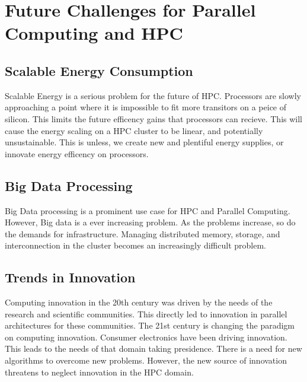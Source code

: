 \setlength{\parindent}{10ex}

\section{Future Challenges for Parallel Computing and HPC}

\subsection{Scalable Energy Consumption}
Scalable Energy is a serious problem for the future of HPC.
Processors are slowly approaching a point where it is impossible to fit more transitors on a peice of silicon.
This limits the future efficency gains that processors can recieve. 
This will cause the energy scaling on a HPC cluster to be linear, and potentially unsustainable.
This is unless, we create new and plentiful energy supplies, or innovate energy efficency on processors.

\subsection{Big Data Processing}
Big Data processing is a prominent use case for HPC and Parallel Computing. 
However, Big data is a ever increasing problem.
As the problems increase, so do the demands for infrastructure.
Managing distributed memory, storage, and interconnection in the cluster becomes an increasingly difficult problem.

\subsection{Trends in Innovation}
Computing innovation in the 20th century was driven by the needs of the research and scientific communities.
This directly led to innovation in parallel architectures for these communities.
The 21st century is changing the paradigm on computing innovation.
Consumer electronics have been driving innovation.
This leads to the needs of that domain taking presidence.
There is a need for new algorithms to overcome new problems.
However, the new source of innovation threatens to neglect innovation in the HPC domain.

